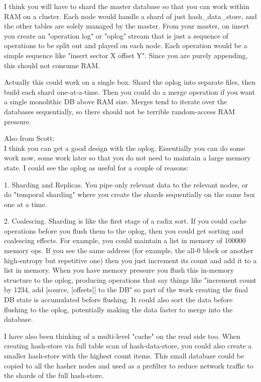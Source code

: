 \documentclass[12pt,twoside]{article}
\begin{document}
I think you will have to shard the master database so that you can work within RAM on a cluster.  Each node would handle a shard of just hash\_data\_store, and the other tables are solely managed by the master.  From your master, on insert you create an "operation log" or "oplog" stream that is just a sequence of operations to be split out and played on each node.  Each operation would be a simple sequence like "insert sector X offset Y".  Since you are purely appending, this should not consume RAM.

Actually this could work on a single box.  Shard the oplog into separate files, then build each shard one-at-a-time.  Then you could do a merge operation if you want a single monolithic DB above RAM size.  Merges tend to iterate over the databases sequentially, so there should not be terrible random-access RAM pressure.

Also from Scott:\\
I think you can get a good design with the oplog.  Essentially you can do some work now, some work later so that you do not need to maintain a large memory state.  I could see the oplog as useful for a couple of reasons:

1. Sharding and Replicas.  You pipe only relevant data to the relevant nodes, or do "temporal sharding" where you create the shards sequentially on the same box one at a time.

2. Coalescing.  Sharding is like the first stage of a radix sort.  If you could cache operations before you flush them to the oplog, then you could get sorting and coalescing effects.  For example, you could maintain a list in memory of 100000 memory ops.  If you see the same address (for example, the all-0 block or another high-entropy but repetitive one) then you just increment its count and add it to a list in memory.  When you have memory pressure you flush this in-memory structure to the oplog, producing operations that say things like "increment count by 1234, add [source, [offsets]] to the DB" so part of the work creating the final DB state is accumulated before flushing.  It could also sort the data before flushing to the oplog, potentially making the data faster to merge into the database.


I have also been thinking of a multi-level "cache" on the read side too.  When creating hash-store via full table scan of hash-data-store, you could also create a smaller hash-store with the highest count items.  This small database could be copied to all the hasher nodes and used as a prefilter to reduce network traffic to the shards of the full hash-store.
\end{document}
